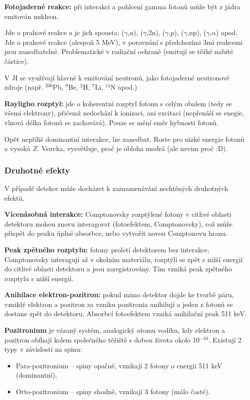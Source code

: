 \textbf{Fotojaderné reakce:} při interakci a pohlcení gamma fotonů může být z jádra emitován nukleon.

Jde o prahové reakce a je jich spousta: ($\gamma$,n), ($\gamma$,2n), ($\gamma$,p), ($\gamma$,np), ($\gamma$,$\alpha$) apod. Jde o prahové reakce (alespoň 5 MeV), v porovnání s předchozími 3mi reakcemi jsou zanedbatelné. Problematické v radiační ochraně (emitují se těžké nabité částice).

V JI se využívají hlavně k emitování neutronů, jako fotojaderné neutronové zdroje (např. $^{206}$Pb, $^{9}$Be, $^2$H, $^{7}$Li, $^{14}$N apod.)

\textbf{Rayligho rozptyl:} jde o koherentní rozptyl fotonu s celým obalem (tedy se všemi elektrony), přičemž nedochází k ionizaci, ani excitaci (nepřenáší se enegie, vlnová délka fotonů se zachovává). Pouze se mění směr hybnosti fotonů.

Opět nepříliš dominantní interakce, lze zanedbat. Roste pro nízké energie fotonů a vysoká $Z$. Vsuvka, vysvětluje, proč je obloha modrá (ale nevim proč :D).

\subsubsection{Druhotné efekty}

V případě detekce může docházet k zaznamenávání nechtěných druhotných efektů.

\textbf{Vícenásobná interakce:} Comptonovsky rozptýlené fotony v citlivé oblasti detektoru mohou znovu interagovat (fotoefektem, Comptonovsky), což může přispět do peaku úplné absorbce, nebo vytvořit novou Comptonovu hranu.

\textbf{Peak zpětného rozptylu:} fotony proletí detektorem bez interakce, Comptonovsky interagují až v okolním materiálu, rozptýlí se zpět s nižší energií do citlivé oblasti detektoru a jsou zaregistrovány. Tím vzniká peak zpětného rozptylu s nižší energií.

\textbf{Anihilace elektron-pozitron:} pokud mimo detektor dojde ke tvorbě páru, vzniklý elektron a pozitron za vzniku pozitronia anihilují a jeden z fotonů se dostane zpět do detektoru. Absorbcí fotoefektem vzniká anihilační peak 511 keV.

\textbf{Pozitronium} je vázaný systém, analogický atomu vodíku, kdy elektron a pozitron obíhají kolem společného těžiště s dobou života okolo 10$^{-10}$. Existují 2 typy v závislosti na spinu:

\begin{itemize}
    \item Para-pozitronium -- spiny opačně, vznikají 2 fotony o energii 511 keV (dominantní),
    \item Orto-pozitronium -- spiny shodně, vznikají 3 fotony (málo časté).
\end{itemize}

